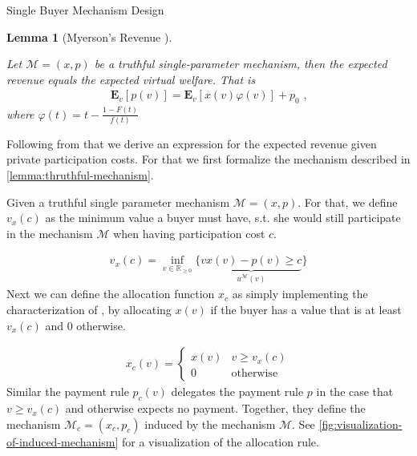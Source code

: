 \documentclass[11pt,a4paper]{article}
\newtheorem{lemma}[theorem]{Lemma}
\newcommand{\RR}{\ensuremath{\mathbb{R}}}
\newcommand{\1}[1]{\mbox{\rm\bf 1}_{#1}}
\newcommand{\eqcomma}{\text{ ,}}
\begin{document}
\begin{section}{Single Buyer Mechanism Design}
 \begin{lemma}[Myerson's Revenue \cite{myerson}]
     \label{lemma:myerson-revenue}

     Let $\mathcal{M}=(x,p)$ be a truthful single-parameter mechanism, then the expected revenue equals the expected virtual welfare. That is
     \begin{align*}
         \mathbf{E}_v\left[p(v)\right]
         = \mathbf{E}_v\left[x(v)\varphi(v)\right] + p_0 \eqcomma
     \end{align*}
     where $\varphi(t) = t - \frac{1 - F(t)}{f(t)}$
 \end{lemma}

 Following from that we derive an expression for the expected revenue given private participation costs.
 For that we first formalize the mechanism described in \cref{lemma:thruthful-mechanism}.

 Given a truthful single parameter mechanism $\mathcal{M}=(x,p)$.
 For that, we define $v_x(c)$ as the minimum value a buyer must have, s.t. she would still participate in the mechanism $\mathcal{M}$ when having participation cost $c$.

 \begin{align*}
     v_x(c) = \inf_{v \in \RR_{\geq 0}} \{\underbrace{vx(v) - p(v) \geq c}_{u^\mathcal{M}(v)}\}
 \end{align*}
 Next we can define the allocation function $x_c$ as simply implementing the characterization of ,
 by allocating $x(v)$ if the buyer has a value that is at least $v_x(c)$ and $0$ otherwise.

 \begin{align*}
     x_c(v) = \begin{cases}
                  x(v) & v \geq v_x(c)    \\
                  0    & \text{otherwise}
              \end{cases}
 \end{align*}
 Similar the payment rule $p_c(v)$ delegates the payment rule $p$ in the case that $v \geq v_x(c)$ and otherwise expects no payment.
 Together, they define the mechanism $\mathcal{M}_c = (x_c, p_c)$ induced by the mechanism $\mathcal{M}$.
 See \cref{fig:visualization-of-induced-mechanism} for a visualization of the allocation rule.

 \begin{figure}[htp!]
     \centering

     \begin{subfigure}{.4\textwidth}
         \centering
\end{subfigure}
\end{figure}
\end{section}
\end{document}
